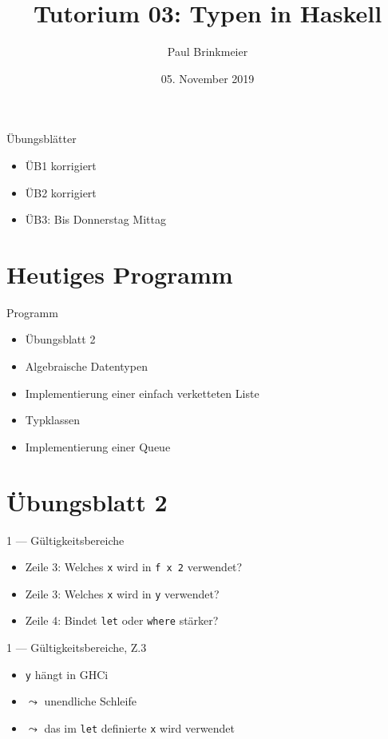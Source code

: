 \documentclass{beamer}
\title{Tutorium 03: Typen in Haskell}
\author{Paul Brinkmeier}
\institute{Tutorium Programmierparadigmen am KIT}
\date{05. November 2019}
\newcommand{\code}[1]{
	\begin{mdframed}
		
	\end{mdframed}
}
\begin{document}
\begin{frame}
	\titlepage
\end{frame}

\begin{frame}{Übungsblätter}
	\begin{itemize}
		\item ÜB1 korrigiert
		\item ÜB2 korrigiert
		\item ÜB3: Bis Donnerstag Mittag
	\end{itemize}
\end{frame}

\section{Heutiges Programm}
\begin{frame}{Programm}
	\begin{itemize}
		\item Übungsblatt 2
		\item Algebraische Datentypen
		\item Implementierung einer einfach verketteten Liste
		\item Typklassen
		\item Implementierung einer Queue
	\end{itemize}
\end{frame}

\section{Übungsblatt 2}

\begin{frame}{1 --- Gültigkeitsbereiche}
	\code{demos/Binding.hs}

	\begin{itemize}
		\item Zeile 3: Welches \texttt{x} wird in \texttt{f x 2} verwendet?
		\item Zeile 3: Welches \texttt{x} wird in \texttt{y} verwendet?
		\item Zeile 4: Bindet \texttt{let} oder \texttt{where} stärker?
	\end{itemize}
\end{frame}

\begin{frame}{1 --- Gültigkeitsbereiche, Z.3}
	\code{demos/LetXInFx.hs}
	\pause
	\begin{itemize}
		\item \texttt{y} hängt in GHCi
		\item $\leadsto$ unendliche Schleife
		\item $\leadsto$ das im \texttt{let} definierte \texttt{x} wird verwendet
	\end{itemize}
\end{frame}
\end{document}
